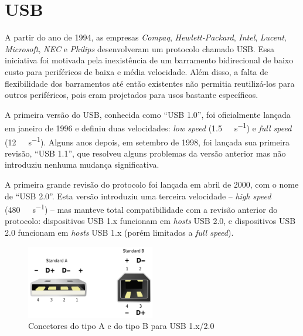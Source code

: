 \documentclass[brazil,pagestart=firstchapter]{abnt}
\begin{document}
\section{USB}
\label{sec:usb}


A partir do ano de 1994, as empresas \textit{Compaq},
\textit{Hewlett-Packard}, \textit{Intel}, \textit{Lucent},
\textit{Microsoft}, \textit{NEC} e \textit{Philips} desenvolveram um
protocolo chamado \ac{USB}. Essa iniciativa foi motivada pela inexistência
de um barramento bidirecional de baixo custo para periféricos de baixa e
média velocidade. Além disso, a falta de flexibilidade dos barramentos até
então existentes não permitia reutilizá-los para outros periféricos, pois
eram projetados para usos bastante específicos. \cite{usb20}

A primeira versão do \ac{USB}, conhecida como ``USB 1.0'', foi oficialmente
lançada em janeiro de 1996 e definiu duas velocidades: \textit{low speed}
(\SI{1.5}{\mega\bit\per\second}) e \textit{full speed}
(\SI{12}{\mega\bit\per\second}). Alguns anos depois, em setembro de 1998, foi
lançada sua primeira revisão, ``USB 1.1'', que resolveu alguns problemas da
versão anterior mas não introduziu nenhuma mudança significativa.

A primeira grande revisão do protocolo foi lançada em abril de 2000, com o
nome de ``USB 2.0''. Esta versão introduziu uma terceira velocidade --
\textit{high speed} (\SI{480}{\mega\bit\per\second}) -- mas manteve total
compatibilidade com a revisão anterior do protocolo: dispositivos USB 1.x
funcionam em \textit{hosts} USB 2.0, e dispositivos USB 2.0 funcionam em
\textit{hosts} USB 1.x (porém limitados a \textit{full speed}).

\begin{figure}[h]
\centering
\includegraphics[width=0.5\textwidth]{img/USB.png}
\caption{Conectores do tipo A e do tipo B para USB 1.x/2.0}
\label{fig:usb_connectors}
\end{figure}
\end{document}
